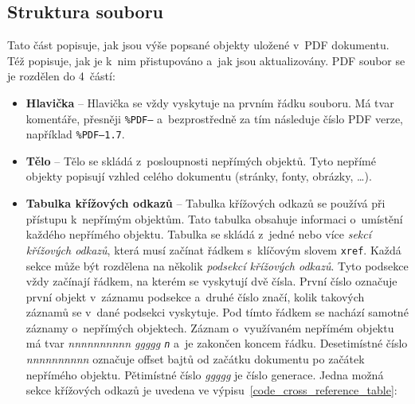 \subsection*{Struktura souboru}
Tato část popisuje, jak jsou výše popsané objekty uložené v~PDF dokumentu.
Též popisuje, jak je k~nim přistupováno a~jak jsou aktualizovány.
PDF soubor se je rozdělen do 4~částí: 
\begin{itemize}
    \item \textbf{Hlavička} -- Hlavička se vždy vyskytuje na prvním řádku souboru.
    Má tvar komentáře, přesněji \texttt{\%PDF–} a~bezprostředně za tím následuje
    číslo PDF verze, například \texttt{\%PDF–1.7}.
    
    \item \textbf{Tělo} -- Tělo se skládá z~posloupnosti nepřímých objektů. Tyto 
    nepřímé objekty popisují vzhled celého dokumentu (stránky, fonty, obrázky,
    \ldots).
    
    \item \textbf{Tabulka křížových odkazů} -- Tabulka křížových odkazů se používá
    při přístupu k~nepřímým objektům. Tato tabulka obsahuje informaci o~umístění
    každého nepřímého objektu. Tabulka se skládá z~jedné nebo více \emph{sekcí
    křížových odkazů}, která musí začínat řádkem s~klíčovým slovem \texttt{xref}.
    Každá sekce může být rozdělena na několik \emph{podsekcí křížových odkazů}.
    Tyto podsekce vždy začínají řádkem, na kterém se vyskytují dvě čísla. První
    číslo označuje první objekt v~záznamu podsekce a~druhé číslo značí, kolik
    takových záznamů se v~dané podsekci vyskytuje. Pod tímto řádkem se nachází
    samotné záznamy o~nepřímých objektech. Záznam o~využívaném nepřímém objektu
    má tvar \emph{nnnnnnnnnn ggggg \texttt{n}} a~je zakončen koncem řádku.
    Desetimístné číslo \emph{nnnnnnnnnn} označuje offset bajtů od začátku
    dokumentu po začátek nepřímého objektu. Pětimístné číslo \emph{ggggg} je
    číslo generace. Jedna možná sekce křížových odkazů je uvedena ve 
    výpisu~\ref{code_cross_reference_table}:
    

\end{itemize}
